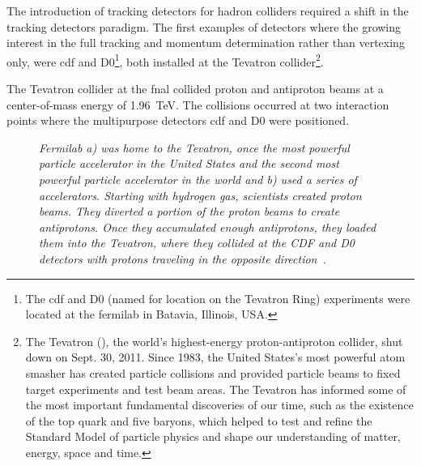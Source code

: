 The introduction of tracking detectors for hadron colliders required a shift in
the tracking detectors paradigm. The first examples of detectors where the
growing interest in the full tracking and momentum determination rather than
vertexing only, were \gls{cdf} and D0\footnote{The \gls{cdf} and D0 (named for
  location on the Tevatron Ring) experiments were located at the \gls{fermilab}
  in Batavia, Illinois, USA. }, both installed at the Tevatron
collider\footnote{The Tevatron (), the world's
  highest-energy proton-antiproton collider, shut down on Sept. 30, 2011. Since
  1983, the United States's most powerful atom smasher has created particle
  collisions and provided particle beams to fixed target experiments and test
  beam areas. The Tevatron has informed some of the most important fundamental
  discoveries of our time, such as the existence of the top quark and five
  baryons, which helped to test and refine the Standard Model of particle
  physics and shape our understanding of matter, energy, space and time.}.

The Tevatron collider at the \gls{fnal} collided proton and antiproton beams at
a center-of-mass energy of 1.96~TeV. The collisions occurred at two interaction
points where the multipurpose detectors \gls{cdf} and D0 were positioned.
\begin{figure}[!htbp]
  \centering {} 
  \caption{\textit{Fermilab a) was home to the Tevatron, once the most powerful
      particle accelerator in the United States and the second most powerful
      particle accelerator in the world and b) used a series of
      accelerators. Starting with hydrogen gas, scientists created proton
      beams. They diverted a portion of the proton beams to create
      antiprotons. Once they accumulated enough antiprotons, they loaded them
      into the Tevatron, where they collided at the CDF and D0 detectors with
      protons traveling in the opposite direction~\cite{Fermilab}.}}
  \label{tevatron_figure}
\end{figure}

